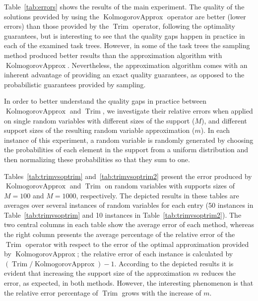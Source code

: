 \documentclass{article}
\DeclareMathOperator{\Trim}{Trim}
\DeclareMathOperator{\OptTrim}{KolmogorovApprox}
\begin{document}
Table~\ref{tab:errors} shows the results of the main experiment. The quality of the solutions provided by using the $\OptTrim$ operator are better (lower errors) than those provided by the $\Trim$ operator, following the optimality guarantees, but is interesting to see that the quality gaps happen in practice in each of the examined task trees. However, in some of the task trees the sampling method produced better results than the approximation algorithm with $\OptTrim$. Nevertheless, the approximation algorithm comes with an inherent advantage of providing an exact quality guarantees, as opposed to the probabilistic guarantees provided by sampling.

In order to better understand the quality gaps in practice between $\OptTrim$ and $\Trim$, we investigate their relative errors when applied on single random variables with different sizes of the support ($M$), and different support sizes of the resulting random variable approximation ($m$). In each instance of this experiment, a random variable is randomly generated by choosing the probabilities of each element in the support from a uniform distribution and then normalizing these probabilities so that they sum to one.

Tables~\ref{tab:trimvsoptrim} and~\ref{tab:trimvsoptrim2} present the error produced by $\OptTrim$ and $\Trim$ on random variables with supports sizes of $M=100$ and $M=1000$, respectively. The depicted results in these tables are averages over several instances of random variables for each entry (50 instances in Table~\ref{tab:trimvsoptrim} and 10 instances in Table~\ref{tab:trimvsoptrim2}). The two central columns in each table show the average error of each method, whereas the right column presents the average percentage of the relative error of the $\Trim$ operator with respect to the error of the optimal approximation provided by $\OptTrim$; the relative error of each instance is calculated by $(\Trim/\OptTrim)-1$. According to the depicted results it is evident that increasing the support size of the approximation $m$ reduces the error, as expected, in both methods. However, the interesting phenomenon is that the relative error percentage of $\Trim$ grows with the increase of $m$.
\end{document}
